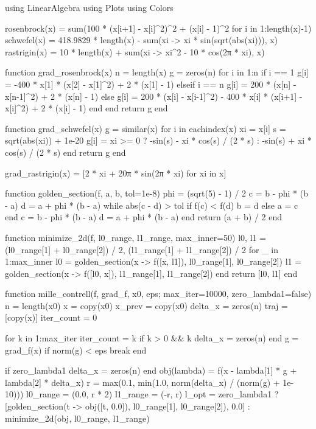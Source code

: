 \documentclass[a4paper, 14pt]{extarticle}
\begin{document}
\begin{breakablelisting}
using LinearAlgebra
using Plots
using Colors

rosenbrock(x) = sum(100 * (x[i+1] - x[i]^2)^2 + (x[i] - 1)^2 for i in 1:length(x)-1)
schwefel(x) = 418.9829 * length(x) - sum(xi -> xi * sin(sqrt(abs(xi))), x)
rastrigin(x) = 10 * length(x) + sum(xi -> xi^2 - 10 * cos(2π * xi), x)

function grad_rosenbrock(x)
    n = length(x)
    g = zeros(n)
    for i in 1:n
        if i == 1
            g[i] = -400 * x[1] * (x[2] - x[1]^2) + 2 * (x[1] - 1)
        elseif i == n
            g[i] = 200 * (x[n] - x[n-1]^2) + 2 * (x[n] - 1)
        else
            g[i] = 200 * (x[i] - x[i-1]^2) - 400 * x[i] * (x[i+1] - x[i]^2) + 2 * (x[i] - 1)
        end
    end
    return g
end

function grad_schwefel(x)
    g = similar(x)
    for i in eachindex(x)
        xi = x[i]
        s = sqrt(abs(xi)) + 1e-20
        g[i] = xi >= 0 ? -sin(s) - xi * cos(s) / (2 * s) : -sin(s) + xi * cos(s) / (2 * s)
    end
    return g
end

grad_rastrigin(x) = [2 * xi + 20π * sin(2π * xi) for xi in x]

function golden_section(f, a, b, tol=1e-8)
    phi = (sqrt(5) - 1) / 2
    c = b - phi * (b - a)
    d = a + phi * (b - a)
    while abs(c - d) > tol
        if f(c) < f(d)
            b = d
        else
            a = c
        end
        c = b - phi * (b - a)
        d = a + phi * (b - a)
    end
    return (a + b) / 2
end

function minimize_2d(f, l0_range, l1_range, max_inner=50)
    l0, l1 = (l0_range[1] + l0_range[2]) / 2, (l1_range[1] + l1_range[2]) / 2
    for _ in 1:max_inner
        l0 = golden_section(x -> f([x, l1]), l0_range[1], l0_range[2])
        l1 = golden_section(x -> f([l0, x]), l1_range[1], l1_range[2])
    end
    return [l0, l1]
end

function mille_contrell(f, grad_f, x0, eps; max_iter=10000, zero_lambda1=false)
    n = length(x0)
    x = copy(x0)
    x_prev = copy(x0)
    delta_x = zeros(n)
    traj = [copy(x)]
    iter_count = 0

    for k in 1:max_iter
        iter_count = k
        if k > 0 && k %
            delta_x = zeros(n)
        end
        g = grad_f(x)
        if norm(g) < eps
            break
        end

        if zero_lambda1
            delta_x = zeros(n)
        end
        obj(lambda) = f(x - lambda[1] * g + lambda[2] * delta_x)
        r = max(0.1, min(1.0, norm(delta_x) / (norm(g) + 1e-10)))
        l0_range = (0.0, r * 2)
        l1_range = (-r, r)
        l_opt = zero_lambda1 ? [golden_section(t -> obj([t, 0.0]), l0_range[1], l0_range[2]), 0.0] : minimize_2d(obj, l0_range, l1_range)


\end{breakablelisting}
\end{document}
